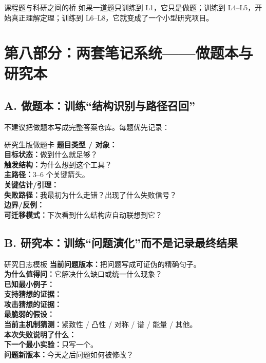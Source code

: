 \documentclass[11pt,a4paper]{ctexart}
\begin{document}
\begin{corebox}{课程题与科研之间的桥}
如果一道题只训练到 L1，它只是做题；训练到 L4--L5，开始真正理解定理；训练到 L6--L8，它就变成了一个小型研究项目。
\end{corebox}

\section{第八部分：两套笔记系统——做题本与研究本}

\subsection{A. 做题本：训练“结构识别与路径召回”}

不建议把做题本写成完整答案仓库。每题优先记录：

\begin{templatebox}{研究生版做题卡}
\textbf{题目类型 / 对象：}\\[0.4em]
\textbf{目标状态：}做到什么就足够？\\[0.4em]
\textbf{触发结构：}为什么想到这个工具？\\[0.4em]
\textbf{主路径：}3--6 个关键箭头。\\[0.4em]
\textbf{关键估计/引理：}\\[0.4em]
\textbf{失败路径：}我最初为什么走错？出现了什么失败信号？\\[0.4em]
\textbf{边界/反例：}\\[0.4em]
\textbf{可迁移模式：}下次看到什么结构应自动联想到它？
\end{templatebox}

\subsection{B. 研究本：训练“问题演化”而不是记录最终结果}

\begin{templatebox}{研究日志模板}
\textbf{当前问题版本：}把问题写成可证伪的精确句子。\\[0.4em]
\textbf{为什么值得问：}它解决什么缺口或统一什么现象？\\[0.4em]
\textbf{已知最小例子：}\\[0.4em]
\textbf{支持猜想的证据：}\\[0.4em]
\textbf{攻击猜想的证据：}\\[0.4em]
\textbf{最脆弱的假设：}\\[0.4em]
\textbf{当前主机制猜测：}紧致性 / 凸性 / 对称 / 谱 / 能量 / 其他。\\[0.4em]
\textbf{本次失败说明了什么：}\\[0.4em]
\textbf{下一个最小实验：}只写一个。\\[0.4em]
\textbf{问题新版本：}今天之后问题如何被修改？
\end{templatebox}
\end{document}
